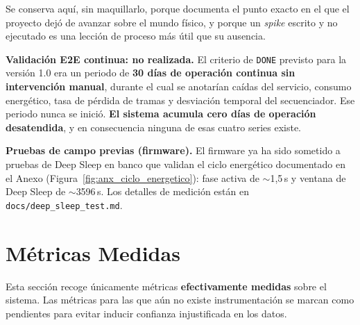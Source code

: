 Se conserva aquí, sin maquillarlo, porque documenta el punto exacto en el que el
proyecto dejó de avanzar sobre el mundo físico, y porque un \textit{spike} escrito y
no ejecutado es una lección de proceso más útil que su ausencia.

\textbf{Validación E2E continua: no realizada.} El criterio de \texttt{DONE} previsto
para la versión 1.0 era un periodo de \textbf{30 días de operación continua sin
intervención manual}, durante el cual se anotarían caídas del servicio, consumo
energético, tasa de pérdida de tramas y desviación temporal del secuenciador. Ese
periodo nunca se inició. \textbf{El sistema acumula cero días de operación
desatendida}, y en consecuencia ninguna de esas cuatro series existe.

\textbf{Pruebas de campo previas (firmware).} El firmware ya ha sido sometido a
pruebas de Deep Sleep en banco que validan el ciclo energético documentado en el
Anexo (Figura~\ref{fig:anx_ciclo_energetico}): fase activa de $\sim$1{,}5\,s y
ventana de Deep Sleep de $\sim$3596\,s. Los detalles de medición están en
\texttt{docs/deep\_sleep\_test.md}.

\section{Métricas Medidas}
\label{sec:testing_metrics}

Esta sección recoge únicamente métricas \textbf{efectivamente medidas} sobre el
sistema. Las métricas para las que aún no existe instrumentación se marcan como
pendientes para evitar inducir confianza injustificada en los datos.

